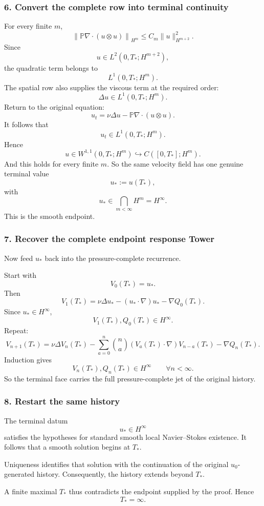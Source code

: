 \documentclass[11pt]{article}
\theoremstyle{definition}
\theoremstyle{remark}
\begin{document}
\subsubsection*{6. Convert the complete row into terminal continuity}

For every finite \(m\),
\[
\left\|
\mathbb P\nabla\cdot(u\otimes u)
\right\|_{H^m}
\le
C_m
\|u\|_{H^{m+2}}^2.
\]
Since
\[
u\in L^2(0,T_*;H^{m+2}),
\]
the quadratic term belongs to
\[
L^1(0,T_*;H^m).
\]
The spatial row also supplies the viscous term at the required order:
\[
\Delta u\in L^1(0,T_*;H^m).
\]
Return to the original equation:
\[
u_t
=
\nu\Delta u
-
\mathbb P\nabla\cdot(u\otimes u).
\]
It follows that
\[
u_t\in L^1(0,T_*;H^m).
\]
Hence
\[
u\in W^{1,1}(0,T_*;H^m)
\hookrightarrow
C([0,T_*];H^m).
\]
And this holds for every finite \(m\).  So the same velocity field has one
genuine terminal value
\[
u_*:=u(T_*),
\]
with
\[
\boxed{
u_*\in
\bigcap_{m<\infty}H^m
=
H^\infty.
}
\]
This is the smooth endpoint.

\subsubsection*{7. Recover the complete endpoint response Tower}

Now feed \(u_*\) back into the pressure-complete recurrence.

Start with
\[
V_0(T_*)=u_*.
\]
Then
\[
V_1(T_*)
=
\nu\Delta u_*
-
(u_*\cdot\nabla)u_*
-
\nabla Q_0(T_*).
\]
Since \(u_*\in H^\infty\),
\[
V_1(T_*),Q_0(T_*)\in H^\infty.
\]
Repeat:
\[
V_{n+1}(T_*)
=
\nu\Delta V_n(T_*)
-
\sum_{a=0}^{n}
\binom na
(V_a(T_*)\cdot\nabla)V_{n-a}(T_*)
-
\nabla Q_n(T_*).
\]
Induction gives
\[
\boxed{
V_n(T_*),Q_n(T_*)\in H^\infty
\qquad
\forall n<\infty.
}
\]
So the terminal face carries the full pressure-complete jet of the original
history.

\subsubsection*{8. Restart the same history}

The terminal datum
\[
u_*\in H^\infty
\]
satisfies the hypotheses for standard smooth local Navier--Stokes existence.
It follows that a smooth solution begins at \(T_*\).

Uniqueness identifies that solution with the continuation of the original
\(u_0\)-generated history.  Consequently, the history extends beyond \(T_*\).

A finite maximal \(T_*\) thus contradicts the endpoint supplied by the proof.
Hence
\[
\boxed{T_*=\infty.}
\]
\end{document}
